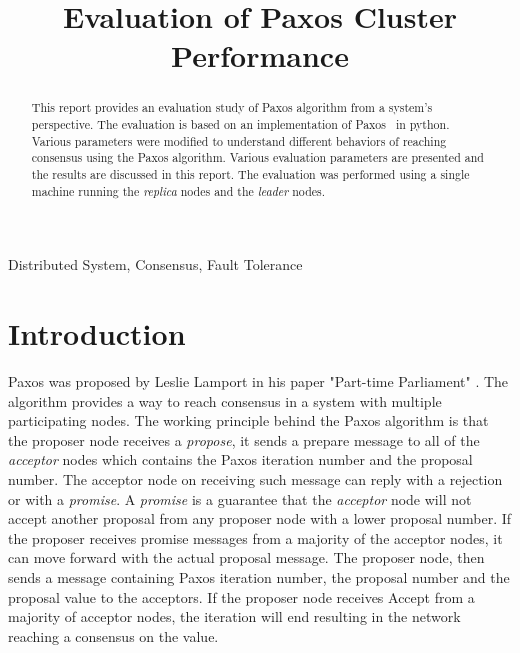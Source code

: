 \documentclass[conference]{IEEEtran}
\begin{document}
\title{Evaluation of Paxos Cluster Performance
}

\author{
}

\maketitle


\begin{abstract}
	This report provides an evaluation study of Paxos algorithm from a system's perspective. 
	The evaluation is based on an implementation of Paxos~\cite{b3} in python.
	Various parameters were modified to understand different behaviors of reaching consensus using the Paxos algorithm. 
	Various evaluation parameters are presented and the results are discussed in this report. 
	The evaluation was performed using a single machine running the \textit{replica} nodes and the \textit{leader} nodes. \\
	
\end{abstract}

\begin{IEEEkeywords}
	Distributed System, Consensus, Fault Tolerance
\end{IEEEkeywords}

\section{Introduction}
Paxos was proposed by Leslie Lamport in his paper "Part-time Parliament" \cite{b1}. 
The algorithm provides a way to reach consensus in a system with multiple participating nodes. 
The working principle behind the Paxos algorithm is that the proposer node receives a \textit{propose}, it sends a prepare message to all of the \textit{acceptor} nodes which contains the Paxos iteration number and the proposal number. 
The acceptor node on receiving such message can reply with a rejection or with a \textit{promise}. 
A \textit{promise} is a guarantee that the \textit{acceptor} node will not accept another proposal from any proposer node with a lower proposal number. 
If the proposer receives promise messages from a majority of the acceptor nodes, it can move forward with the actual proposal message. 
The proposer node, then sends a message containing Paxos iteration number, the proposal number and the proposal value to the acceptors. 
If the proposer node receives Accept from a majority of acceptor nodes, the iteration will end resulting in the network reaching a consensus on the value. \\
\end{document}

